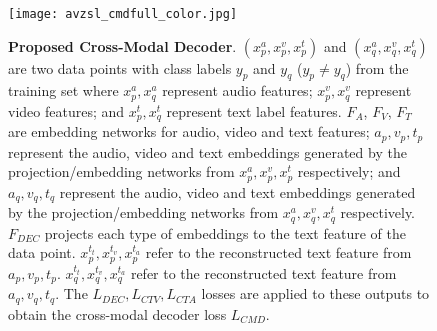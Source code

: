 \documentclass[10pt,twocolumn,letterpaper]{article}
\begin{document}
\begin{figure}[t]
  \centering
  \texttt{[image: avzsl\_cmdfull\_color.jpg]}
\caption{\textbf{Proposed Cross-Modal Decoder}. $(x^a_p, x^v_p, x^t_p)$ and $(x^a_q, x^v_q, x^t_q)$ are two data points with class labels $y_p$ and $y_q$ ($y_p\neq y_q$) from the training set where $x^a_p,x^a_q$ represent audio features; $x^v_p,x^v_q$ represent video features; and $x^t_p,x^t_q$ represent text label features. $F_A$, $F_V$, $F_T$ are embedding networks for audio, video and text features; $a_p, v_p, t_p$ represent the audio, video and text embeddings generated by the projection/embedding networks from $x^a_p, x^v_p, x^t_p$ respectively; and $a_q, v_q, t_q$ represent the audio, video and text embeddings generated by the projection/embedding networks from $x^a_q, x^v_q, x^t_q$ respectively. $F_{DEC}$ projects each type of embeddings to the text feature of the data point. $x_p^{t_t},x_p^{t_v},x_p^{t_a}$ refer to the reconstructed text feature from $a_p, v_p, t_p$. $x_q^{t_t},x_q^{t_v},x_q^{t_a}$ refer to the reconstructed text feature from $a_q, v_q, t_q$. The $L_{DEC},L_{CTV},L_{CTA}$ losses are applied to these outputs to obtain the cross-modal decoder loss $L_{CMD}$.}
\label{fig:aeloss}
  \vspace{-10pt}
\end{figure}
\end{document}
